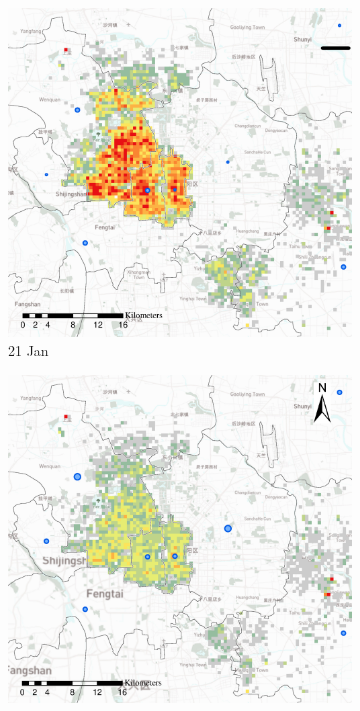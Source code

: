 \documentclass[preprints,article,accept,moreauthors,pdftex]{Definitions/mdpi}
\begin{document}
\begin{figure}[ht]
    \centering
    \begin{subfigure}{.3\textwidth}
        \includegraphics[width=\textwidth]{Figures/Relation_with_confrimed_cases/NewDistrictSSBD2020_01_21.eps}
        \caption{21 Jan}
    \end{subfigure}
    \begin{subfigure}{.3\textwidth}
        \includegraphics[width=\textwidth]{Figures/Relation_with_confrimed_cases/NewDistrictSSBD2020_01_25.eps}

\end{subfigure}
\end{figure}
\end{document}
